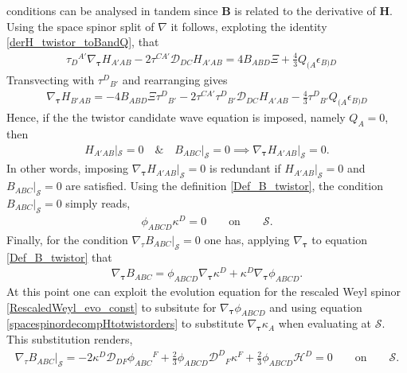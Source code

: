 \documentclass[10pt,a4paper]{article}
\theoremstyle{plain}
\def\bmB{{\bm B}}
\def\bmH{{\bm H}}
\begin{document}
conditions can be analysed in tandem since $\bmB$ is related to the
derivative of $\bmH$. Using the space spinor split of $\nabla$ it
follows, exploting the identity \eqref{derH_twistor_toBandQ}, that
\begin{align}
  \tau _{D}{}^{A'}\nabla_{\bm\tau} H_{A'AB} -2 \tau ^{CA'} \mathcal{D}
  _{DC}H_{A'AB} = 4 B_{ABD} \Xi + \tfrac{4}{3} Q_{(A}\epsilon
  _{B)D}\quad
\end{align}
Transvecting with $\tau^{D}{}_{B'}$ and rearranging gives
\begin{align}\label{time-derHToBHQ}
\nabla_{\bm\tau} H_{B'AB} = -4 B_{ABD} \Xi \tau ^{D}{}_{B'} -2 \tau ^{CA'}
\tau ^{D}{}_{B'} \mathcal{D} _{DC}H_{A'AB} - \tfrac{4}{3} \tau
^{D}{}_{B'}Q_{(A}\epsilon _{B)D}
\end{align}
Hence, if the the twistor candidate wave equation is imposed, namely
$Q_A=0$, then
\begin{align}
H_{A'AB}|_{\mathcal{S}}=0\quad \& \quad B_{ABC}|_{\mathcal{S}}=0
\implies \nabla_{\bm\tau} H_{A'AB}|_{\mathcal{S}}=0.
\end{align}
In other words, imposing $\nabla_{\bm\tau} H_{A'AB}|_{\mathcal{S}}=0$ is
redundant if $H_{A'AB}|_{\mathcal{S}}=0$ and $
B_{ABC}|_{\mathcal{S}}=0$ are satisfied.  Using the definition
\eqref{Def_B_twistor}, the condition $B_{ABC}|_{\mathcal{S}}=0$ simply
reads,
\begin{align}\label{B_twistor_vanishes_ID}
  \phi_{ABCD}\kappa^D=0 \qquad \text{on} \qquad \mathcal{S}.
\end{align}
Finally, for the condition $\nabla_{\tau}B_{ABC}|_{\mathcal{S}}=0$ one
has, applying $\nabla_{\bm\tau}$ to equation \eqref{Def_B_twistor} that
\begin{align}
\nabla_{\bm\tau} B_{ABC} = \phi _{ABCD}\nabla_{\bm\tau} \kappa ^{D} + \kappa
^{D} \nabla_{\bm\tau} \phi _{ABCD} .
\end{align}
At this point one can exploit the evolution equation for the rescaled
Weyl spinor \eqref{RescaledWeyl_evo_const} to subsitute for
$\nabla_{\bm\tau} \phi_{ABCD}$ and using equation
\eqref {spacespinordecompHtotwistorders}
to substitute $\nabla_{\bm\tau} \kappa_A$ when evaluating at
$\mathcal{S}$. This substitution renders,
\begin{align}\label{normalderB_twistor_exp}
\nabla_{\tau}B_{ABC}|_{\mathcal{S}}= -2\kappa ^{D} \mathcal{D}
_{DF}\phi _{ABC}{}^{F} + \tfrac{2}{3} \phi _{ABCD} \mathcal{D}
^{D}{}_{F}\kappa ^{F} + \tfrac{2}{3}\phi_{ABCD}\mathcal{H}^D = 0
\qquad \text{on} \qquad \mathcal{S}.
\end{align}
\end{document}
